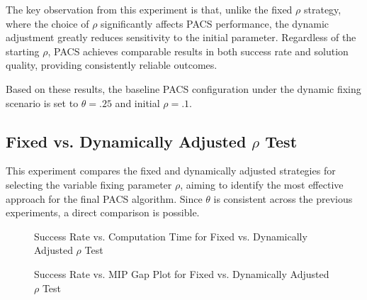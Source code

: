 The key observation from this experiment is that, unlike the fixed $\rho$ strategy, where the choice of $\rho$ significantly affects PACS performance, the dynamic adjustment greatly reduces sensitivity to the initial parameter. Regardless of the starting $\rho$, PACS achieves comparable results in both success rate and solution quality, providing consistently reliable outcomes.

Based on these results, the baseline PACS configuration under the dynamic fixing scenario is set to $\theta = .25$ and initial $\rho = .1$.

\subsection{Fixed vs. Dynamically Adjusted $\rho$ Test}\label{sec:test_fixvsdyn_rho}
This experiment compares the fixed and dynamically adjusted strategies for selecting the variable fixing parameter $\rho$, aiming to identify the most effective approach for the final PACS algorithm. Since $\theta$ is consistent across the previous experiments, a direct comparison is possible.

\begin{figure}[H]
\centering
\begin{minipage}{0.6\columnwidth}
\centering
\resizebox{\linewidth}{!}{}
\end{minipage}%
\hfill
\begin{minipage}{0.4\columnwidth}
\centering
\resizebox{\linewidth}{!}{}
\end{minipage}
\caption{Success Rate vs. Computation Time for Fixed vs. Dynamically Adjusted $\rho$ Test}
\label{fig:PACS_STD_DYN_SuccRate}
\end{figure}

\begin{figure}[H]
\centering
\begin{minipage}{0.6\columnwidth}
\centering
\resizebox{\linewidth}{!}{}
\end{minipage}%
\hfill
\begin{minipage}{0.4\columnwidth}
\centering
\resizebox{\linewidth}{!}{}
\end{minipage}
\caption{Success Rate vs. MIP Gap Plot for Fixed vs. Dynamically Adjusted $\rho$ Test}
\label{fig:PACS_STD_DYN_MGAP}
\end{figure}

